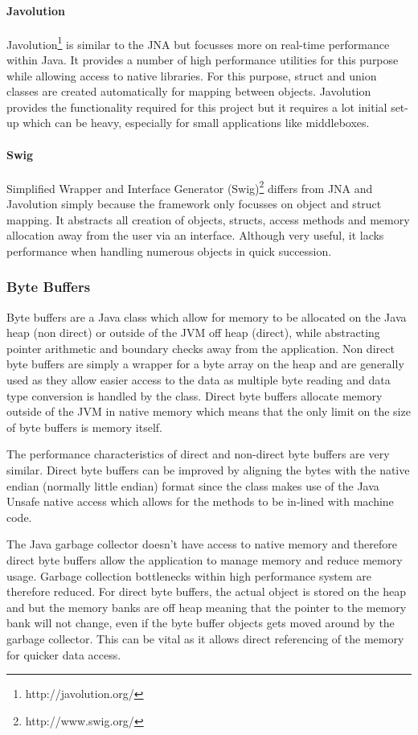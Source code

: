 \documentclass[final_report.tex]{subfiles}
\begin{document}
\paragraph*{Javolution}
Javolution\footnote{http://javolution.org/} is similar to the JNA but focusses more on real-time performance within Java. It provides a number of high performance utilities for this purpose while allowing access to native libraries. For this purpose, struct and union classes are created automatically for mapping between objects. Javolution provides the functionality required for this project but it requires a lot initial set-up which can be heavy, especially for small applications like middleboxes.

\paragraph*{Swig}
Simplified Wrapper and Interface Generator (Swig)\footnote{http://www.swig.org/} differs from JNA and Javolution simply because the framework only focusses on object and struct mapping. It abstracts all creation of objects, structs, access methods and memory allocation away from the user via an interface. Although very useful, it lacks performance when handling numerous objects in quick succession. 

\subsubsection{Byte Buffers}
Byte buffers \cite{jenkov} are a Java class which allow for memory to be allocated on the Java heap (non direct) or outside of the JVM off heap (direct), while abstracting pointer arithmetic and boundary checks away from the application. Non direct byte buffers are simply a wrapper for a byte array on the heap and are generally used as they allow easier access to the data as multiple byte reading and data type conversion is handled by the class. Direct byte buffers allocate memory outside of the JVM in native memory which means that the only limit on the size of byte buffers is memory itself.

The performance characteristics of direct and non-direct byte buffers are very similar. Direct byte buffers can be improved by aligning the bytes with the native endian (normally little endian) format since the class makes use of the Java Unsafe native access which allows for the methods to be in-lined with machine code.

The Java garbage collector doesn't have access to native memory and therefore direct byte buffers allow the application to manage memory and reduce memory usage. Garbage collection bottlenecks within high performance system are therefore reduced. For direct byte buffers, the actual object is stored on the heap and but the memory banks are off heap meaning that the pointer to the memory bank will not change, even if the byte buffer objects gets moved around by the garbage collector. This can be vital as it allows direct referencing of the memory for quicker data access.
\end{document}
